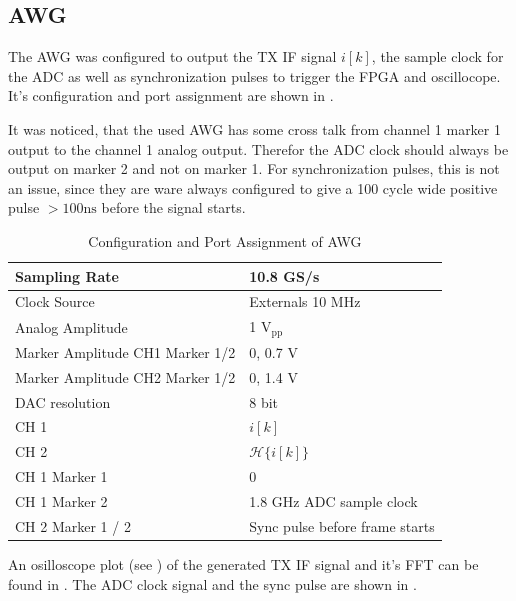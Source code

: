 \subsection{\gls{AWG}}
The \gls{AWG} was configured to output the \gls{TX} \gls{IF} signal $i[k]$,
the sample clock for the \gls{ADC} as well as synchronization pulses to trigger
the \gls{FPGA} and oscillocope. It's configuration and port assignment
are shown in .

It was noticed, that the used \gls{AWG} has some cross talk from
channel 1 marker 1 output to the channel 1 analog output. Therefor the
\gls{ADC} clock should always be output on marker 2 and not on marker 1.
For synchronization pulses, this is not an issue, since they are ware always
configured to give a 100 cycle wide positive pulse $> 100 \text{ns}$ before
the signal starts. \\

\begin{table}[h]
  \centering
  \begin{tabular}{|l|l|}
    \hline
    Sampling Rate & 10.8 GS/s \\ \hline
    Clock Source & Externals 10 MHz \\ \hline
    Analog Amplitude & 1 $\text{V}_{\text{pp}}$ \\ \hline
    Marker Amplitude CH1 Marker 1/2 & 0, 0.7 V \\ \hline
    Marker Amplitude CH2 Marker 1/2 & 0, 1.4 V \\ \hline
    \gls{DAC} resolution & 8 bit \\ \hline
    CH 1 & $i[k]$ \\ \hline
    CH 2 & $\mathcal{H}\{i[k]\}$ \\ \hline
    CH 1 Marker 1 & 0 \\ \hline
    CH 1 Marker 2 & 1.8 GHz \gls{ADC} sample clock \\ \hline
    CH 2 Marker 1 / 2 & Sync pulse before frame starts \\ \hline
  \end{tabular}
  \caption{Configuration and Port Assignment of \gls{AWG}}
  \label{tab:res_450}
\end{table}

An osilloscope plot (see ) of the generated
\gls{TX} \gls{IF} signal and it's \gls{FFT} can be found in
.
The \gls{ADC} clock signal and the sync pulse are shown
in . \\

